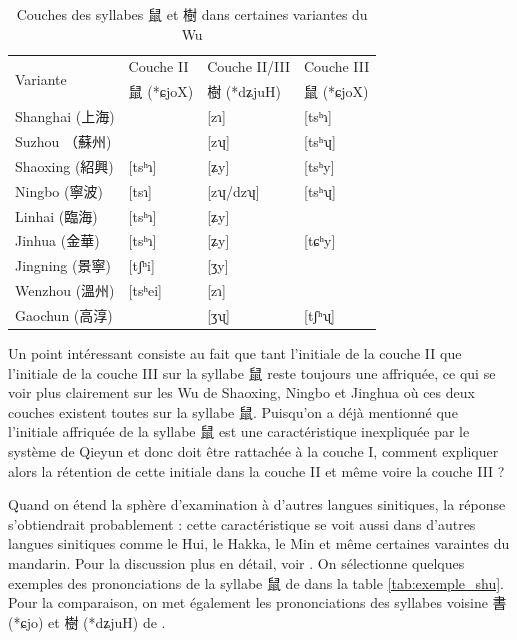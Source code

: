\documentclass{scrbook}
\newcounter{c}[subsubsection]
\begin{document}
\begin{sloppypar}
\begin{table}[htbp]
    \begin{tabular}{lrll}
    \toprule
    \multirow{2}[2]{*}{Variante} & \multicolumn{1}{l}{Couche II} & Couche II/III & Couche III \\
          & \multicolumn{1}{l}{鼠 (*ɕjoX)} & 樹 (*dʑjuH) & 鼠 (*ɕjoX) \\
    \midrule
    Shanghai (上海) &       & [zɿ]  & [tsʰɿ] \\
    Suzhou （蘇州) &       & [zʮ]  & [tsʰʮ] \\
    Shaoxing (紹興) & \multicolumn{1}{l}{\cellcolor[rgb]{ .851,  .851,  .851}[tsʰɿ]} & [ʑy]  & \cellcolor[rgb]{ .851,  .851,  .851}[tsʰy] \\
    Ningbo (寧波) & \multicolumn{1}{l}{\cellcolor[rgb]{ .851,  .851,  .851}[tsɿ]} & [zʮ/dzʮ] & \cellcolor[rgb]{ .851,  .851,  .851}[tsʰʮ] \\
	\midrule    
    Linhai (臨海) & \multicolumn{1}{l}{[tsʰɿ]} & [ʑy]  &  \\
    Jinhua (金華) & \multicolumn{1}{l}{\cellcolor[rgb]{ .851,  .851,  .851}[tsʰɿ]} & [ʑy]  & \cellcolor[rgb]{ .851,  .851,  .851}[tɕʰy] \\
    Jingning (景寧) & \multicolumn{1}{l}{[tʃʰi]} & [ʒy]  &  \\
    Wenzhou (溫州) & \multicolumn{1}{l}{[tsʰei]} & [zɿ]  &  \\
	\midrule    
    Gaochun (高淳) &       & [ʒʯ]  & [tʃʰʯ] \\
    \bottomrule
    \end{tabular}%
  \caption{Couches des syllabes 鼠 et 樹 dans certaines variantes du Wu}
  \label{tab:exemple_shu_wu}%
\end{table}%
 
Un point intéressant consiste au fait que tant l'initiale de la couche II que l'initiale de la couche III sur la syllabe 鼠 reste toujours une affriquée, ce qui se voir plus clairement sur les Wu de Shaoxing, Ningbo et Jinghua où ces deux couches existent toutes sur la syllabe 鼠. Puisqu'on a déjà mentionné que l'initiale affriquée de la syllabe 鼠 est une caractéristique inexpliquée par le système de Qieyun et donc doit être rattachée à la couche I, comment expliquer alors la rétention de cette initiale dans la couche II et même voire la couche III ? 

Quand on étend la sphère d'examination à d'autres langues sinitiques, la réponse s'obtiendrait probablement : cette caractéristique se voit aussi dans d'autres langues sinitiques comme le Hui, le Hakka, le Min et même certaines varaintes du mandarin. Pour la discussion plus en détail, voir \textcite[30--37]{Xie2003kejia}. On sélectionne quelques exemples des prononciations de la syllabe 鼠 de \textcite[1221]{Li2002fangyan} dans la table \ref{tab:exemple_shu}. Pour la comparaison, on met également les prononciations des syllabes voisine 書 (*ɕjo) et 樹 (*dʑjuH) de \textcite[3460, 5634--5635]{Li2002fangyan}.


\end{sloppypar}
\end{document}
